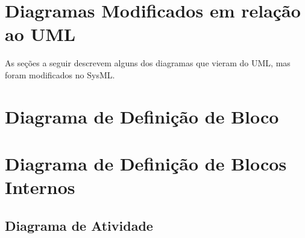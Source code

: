 \section{Diagramas Modificados em relação ao UML}
As seções a seguir descrevem alguns dos diagramas que vieram do UML, mas foram modificados no SysML.

\section{Diagrama de Definição de Bloco}


\section{Diagrama de Definição de Blocos Internos}


\subsection{Diagrama de Atividade}
